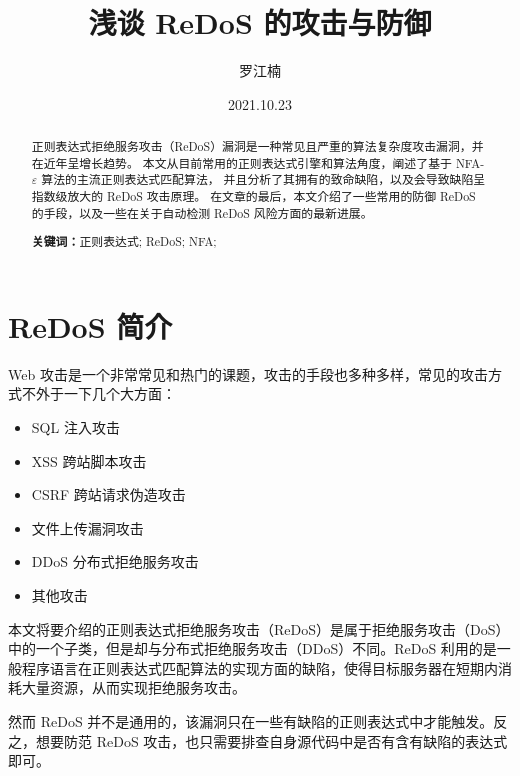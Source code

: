 \documentclass[hyperref,UTF8,12pt,a4paper]{ctexart}
\title{浅谈 ReDoS 的攻击与防御}
\author{罗江楠}
\date{2021.10.23}
\begin{document}
\maketitle

\newpage

\tableofcontents

\newpage

\begin{abstract}

\vspace{\baselineskip}

正则表达式拒绝服务攻击（ReDoS）漏洞是一种常见且严重的算法复杂度攻击漏洞，并在近年呈增长趋势。
本文从目前常用的正则表达式引擎和算法角度，阐述了基于 NFA-$\varepsilon$ 算法的主流正则表达式匹配算法，
并且分析了其拥有的致命缺陷，以及会导致缺陷呈指数级放大的 ReDoS 攻击原理。
在文章的最后，本文介绍了一些常用的防御 ReDoS 的手段，以及一些在关于自动检测 ReDoS 风险方面的最新进展。

\par\textbf{关键词：}正则表达式; ReDoS; NFA;

\end{abstract}

\newpage

\section{ReDoS 简介}

Web 攻击是一个非常常见和热门的课题，攻击的手段也多种多样，常见的攻击方式不外于一下几个大方面：

\begin{itemize}
\item SQL 注入攻击
\item XSS 跨站脚本攻击
\item CSRF 跨站请求伪造攻击
\item 文件上传漏洞攻击
\item DDoS 分布式拒绝服务攻击
\item 其他攻击
\end{itemize}

本文将要介绍的正则表达式拒绝服务攻击（ReDoS）是属于拒绝服务攻击（DoS）中的一个子类，但是却与分布式拒绝服务攻击（DDoS）不同。ReDoS 利用的是一般程序语言在正则表达式匹配算法的实现方面的缺陷，使得目标服务器在短期内消耗大量资源，从而实现拒绝服务攻击。

然而 ReDoS 并不是通用的，该漏洞只在一些有缺陷的正则表达式中才能触发。反之，想要防范 ReDoS 攻击，也只需要排查自身源代码中是否有含有缺陷的表达式即可。
\end{document}
